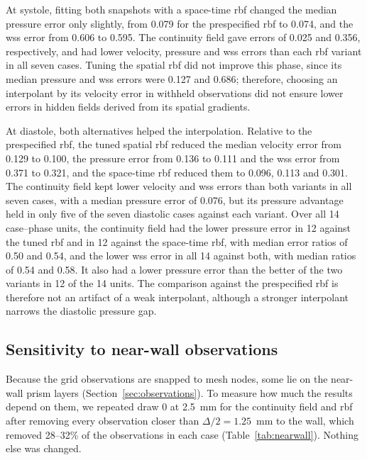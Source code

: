 \documentclass[12pt,a4paper]{article}
\newcommand{\WSS}{\ac{wss}\xspace}
\newcommand{\RBF}{\ac{rbf}\xspace}
\theoremstyle{definition}
\numberwithin{equation}{section}
\begin{document}
At systole, fitting both snapshots with a space-time \RBF changed the median pressure error only slightly, from 0.079 for the prespecified \RBF to 0.074, and the \WSS error from 0.606 to 0.595. The continuity field gave errors of 0.025 and 0.356, respectively, and had lower velocity, pressure and \WSS errors than each \RBF variant in all seven cases. Tuning the spatial \RBF did not improve this phase, since its median pressure and \WSS errors were 0.127 and 0.686; therefore, choosing an interpolant by its velocity error in withheld observations did not ensure lower errors in hidden fields derived from its spatial gradients.

At diastole, both alternatives helped the interpolation. Relative to the prespecified \RBF, the tuned spatial \RBF reduced the median velocity error from 0.129 to 0.100, the pressure error from 0.136 to 0.111 and the \WSS error from 0.371 to 0.321, and the space-time \RBF reduced them to 0.096, 0.113 and 0.301. The continuity field kept lower velocity and \WSS errors than both variants in all seven cases, with a median pressure error of 0.076, but its pressure advantage held in only five of the seven diastolic cases against each variant. Over all 14 case--phase units, the continuity field had the lower pressure error in 12 against the tuned \RBF and in 12 against the space-time \RBF, with median error ratios of 0.50 and 0.54, and the lower \WSS error in all 14 against both, with median ratios of 0.54 and 0.58. It also had a lower pressure error than the better of the two variants in 12 of the 14 units. The comparison against the prespecified \RBF is therefore not an artifact of a weak interpolant, although a stronger interpolant narrows the diastolic pressure gap.




\subsection{Sensitivity to near-wall observations}
\label{sec:nearwall}
Because the grid observations are snapped to mesh nodes, some lie on the near-wall prism layers (Section~\ref{sec:observations}). To measure how much the results depend on them, we repeated draw 0 at 2.5~mm for the continuity field and \RBF after removing every observation closer than $\Delta/2=1.25$~mm to the wall, which removed 28--32\% of the observations in each case (Table~\ref{tab:nearwall}). Nothing else was changed.
\end{document}
